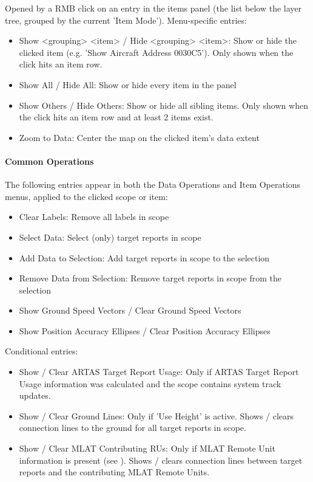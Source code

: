 Opened by a RMB click on an entry in the items panel (the list below the layer tree, grouped by the current 'Item Mode'). Menu-specific entries:

\begin{itemize}
 \item Show <grouping> <item> / Hide <grouping> <item>: Show or hide the clicked item (e.g. 'Show Aircraft Address 0030C5'). Only shown when the click hits an item row.
 \item Show All / Hide All: Show or hide every item in the panel
 \item Show Others / Hide Others: Show or hide all sibling items. Only shown when the click hits an item row and at least 2 items exist.
 \item Zoom to Data: Center the map on the clicked item's data extent
\end{itemize}

\paragraph{Common Operations}

The following entries appear in both the Data Operations and Item Operations menus, applied to the clicked scope or item:

\begin{itemize}
 \item Clear Labels: Remove all labels in scope
 \item Select Data: Select (only) target reports in scope
 \item Add Data to Selection: Add target reports in scope to the selection
 \item Remove Data from Selection: Remove target reports in scope from the selection
 \item Show Ground Speed Vectors / Clear Ground Speed Vectors
 \item Show Position Accuracy Ellipses / Clear Position Accuracy Ellipses
\end{itemize}

Conditional entries:

\begin{itemize}
 \item Show / Clear ARTAS Target Report Usage: Only if ARTAS Target Report Usage information was calculated and the scope contains system track updates.
 \item Show / Clear Ground Lines: Only if 'Use Height' is active. Shows / clears connection lines to the ground for all target reports in scope.
 \item Show / Clear MLAT Contributing RUs: Only if MLAT Remote Unit information is present (see ). Shows / clears connection lines between target reports and the contributing MLAT Remote Units.
\end{itemize}
